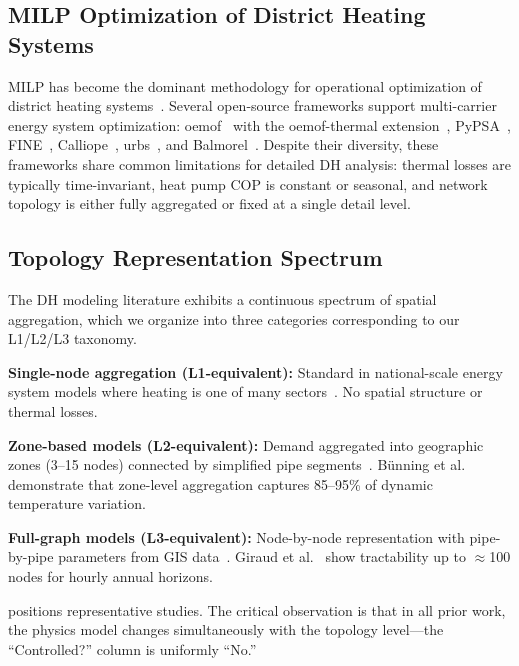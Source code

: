 \documentclass[review,3p]{elsarticle}
\begin{document}
\subsection{MILP Optimization of District Heating Systems}
\label{sec:rw_milp}

MILP has become the dominant methodology for operational optimization
of district heating systems~\cite{Fang2016,Guelpa2019review}. Several
open-source frameworks support multi-carrier energy system optimization:
oemof~\cite{Hilpert2018_oemof} with the oemof-thermal
extension~\cite{Krien2020_oemofthermal},
PyPSA~\cite{Brown2018_pypsa}, FINE~\cite{Welder2018_FINE},
Calliope~\cite{Pfenninger2018_calliope}, urbs~\cite{Dorfner2016_urbs},
and Balmorel~\cite{Wiese2018_balmorel}. Despite their diversity, these
frameworks share common limitations for detailed DH analysis: thermal
losses are typically time-invariant, heat pump COP is constant or
seasonal, and network topology is either fully aggregated or fixed at
a single detail level.

\subsection{Topology Representation Spectrum}
\label{sec:rw_topology}

The DH modeling literature exhibits a continuous spectrum of spatial
aggregation, which we organize into three categories corresponding
to our L1/L2/L3 taxonomy.

\textbf{Single-node aggregation (L1-equivalent):} Standard in
national-scale energy system models where heating is one of many
sectors~\cite{Connolly2014_EnergyPLAN,Brown2018_pypsa,
Lund2017_SmartEnergy}. No spatial structure or thermal losses.

\textbf{Zone-based models (L2-equivalent):} Demand aggregated into
geographic zones (3--15 nodes) connected by simplified pipe
segments~\cite{Wirtz2020,Mertz2016,Buffa2019}. Bünning et
al.~\cite{Buenning2020} demonstrate that zone-level aggregation
captures 85--95\% of dynamic temperature variation.

\textbf{Full-graph models (L3-equivalent):} Node-by-node
representation with pipe-by-pipe parameters from GIS
data~\cite{Vesterlund2017,Schweiger2017,vanderHeijde2017,
Blommaert2020}. Giraud et al.~\cite{Giraud2015} show tractability
up to $\approx$100 nodes for hourly annual horizons.

 positions representative studies. The critical
observation is that in all prior work, the physics model changes
simultaneously with the topology level---the ``Controlled?'' column
is uniformly ``No.''
\end{document}
